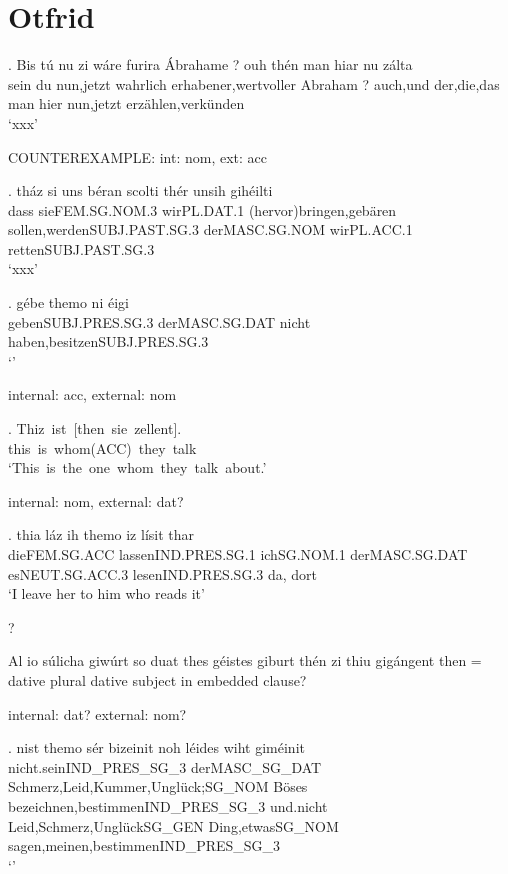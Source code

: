 \phantom{x}

\section{Otfrid}

\exg. Bis tú nu {zi wáre} furira Ábrahame ? ouh thén man hiar nu zálta\\
 sein du nun,jetzt wahrlich erhabener,wertvoller Abraham ? auch,und der,die,das man hier nun,jetzt erzählen,verkünden\\
 `xxx' \label{ex:ohg-dat-acc}

COUNTEREXAMPLE: int: nom, ext: acc

\exg. tház	si	uns	béran	scolti	thér	unsih	gihéilti\\
dass	sieFEM.SG.NOM.3	wirPL.DAT.1	(hervor)bringen,gebären	sollen,werdenSUBJ.PAST.SG.3	derMASC.SG.NOM	wirPL.ACC.1	rettenSUBJ.PAST.SG.3\\
 `xxx' 

 \exg. gébe themo	ni	éigi\\
 gebenSUBJ.PRES.SG.3	derMASC.SG.DAT	nicht	haben,besitzenSUBJ.PRES.SG.3\\
 `' 

 internal: acc, external: nom

 \exg. Thiz ist [then sie zellent].\\
  this is whom(ACC) they talk\\
  `This is the one whom they talk about.' 

  internal: nom, external: dat?

  \exg. thia	láz	ih	themo	iz	lísit	thar\\
  dieFEM.SG.ACC	lassenIND.PRES.SG.1	ichSG.NOM.1	derMASC.SG.DAT	esNEUT.SG.ACC.3	lesenIND.PRES.SG.3	da, dort\\
  `I leave her to him who reads it' 


?

Al	io	súlicha	giwúrt	so	duat	thes	géistes	giburt	thén	zi	thiu	gigángent
then = dative plural
dative subject in embedded clause?

internal: dat? external: nom?

\exg. nist	themo	sér	bizeinit	noh	léides	wiht	giméinit\\
nicht.seinIND_PRES_SG_3	derMASC_SG_DAT	Schmerz,Leid,Kummer,Unglück;SG_NOM Böses	bezeichnen,bestimmenIND_PRES_SG_3 und.nicht Leid,Schmerz,UnglückSG_GEN	Ding,etwasSG_NOM	sagen,meinen,bestimmenIND_PRES_SG_3\\
  `' 


\phantom{x}
